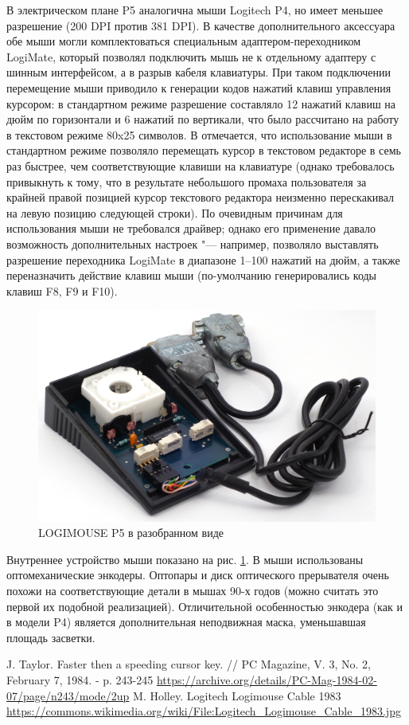 \documentclass[11pt, a4paper]{article}
\begin{document}
В электрическом плане P5 аналогична мыши Logitech P4, но имеет меньшее разрешение (200 DPI против 381 DPI). В качестве дополнительного аксессуара обе мыши могли комплектоваться специальным адаптером-переходником LogiMate, который позволял подключить мышь не к отдельному адаптеру с шинным интерфейсом, а в разрыв кабеля клавиатуры. При таком подключении перемещение мыши приводило к генерации кодов нажатий клавиш управления курсором: в стандартном режиме разрешение составляло 12 нажатий клавиш на дюйм по горизонтали и 6 нажатий по вертикали, что было рассчитано на работу в текстовом режиме 80x25 символов. В \cite{logimouse} отмечается, что использование мыши в стандартном режиме позволяло перемещать курсор в текстовом редакторе в семь раз быстрее, чем соответствующие клавиши на клавиатуре (однако требовалось привыкнуть к тому, что в результате небольшого промаха пользователя за крайней правой позицией курсор текстового редактора неизменно перескакивал на левую позицию следующей строки). По очевидным причинам для использования мыши не требовался драйвер; однако его применение давало возможность дополнительных настроек "--- например, позволяло выставлять разрешение переходника LogiMate в диапазоне 1--100 нажатий на дюйм, а также переназначить действие клавиш мыши (по-умолчанию генерировались коды клавиш F8, F9 и F10).

 \begin{figure}[h]
    \centering
    \includegraphics[scale=0.7]{1983_logitech_logimouse_p5/inside_30.jpg}
    \caption{LOGIMOUSE P5 в разобранном виде}
    \label{fig:LogimouseP5Inside}
\end{figure}

Внутреннее устройство мыши показано на рис. \ref{fig:LogimouseP5Inside}. В мыши использованы оптомеханические энкодеры. Оптопары и диск оптического прерывателя очень похожи на соответствующие детали в мышах 90-х годов (можно считать это первой их подобной реализацией). Отличительной особенностью энкодера (как и в модели P4) является дополнительная неподвижная маска, уменьшавшая площадь засветки.

\begin{thebibliography}{9}
 J. Taylor. Faster then a speeding cursor key. // PC Magazine, V. 3, No. 2, February 7, 1984. - p. 243-245 \url{https://archive.org/details/PC-Mag-1984-02-07/page/n243/mode/2up}
 M. Holley. Logitech Logimouse Cable 1983 \url{https://commons.wikimedia.org/wiki/File:Logitech_Logimouse_Cable_1983.jpg}
\end{thebibliography}
\end{document}
